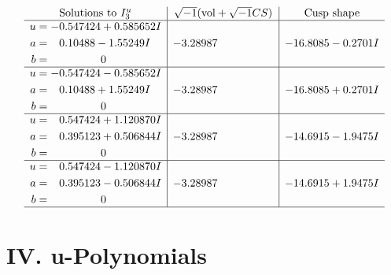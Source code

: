 \documentclass[1p]{elsarticle_modified}
\theoremstyle{definition}
\newcommand{\I}{\sqrt{-1}}
\begin{document}
$$\begin{array}{c|c|c}  
\text{Solutions to }I^u_{3}& \I (\text{vol} + \sqrt{-1}CS) & \text{Cusp shape}\\
 \hline 
\begin{aligned}
u &= -0.547424 + 0.585652 I \\
a &= \phantom{-}0.10488 - 1.55249 I \\
b &= \phantom{-0.000000 } 0\end{aligned}
 & -3.28987\phantom{ +0.000000I} & -16.8085 - 0.2701 I \\ \hline\begin{aligned}
u &= -0.547424 - 0.585652 I \\
a &= \phantom{-}0.10488 + 1.55249 I \\
b &= \phantom{-0.000000 } 0\end{aligned}
 & -3.28987\phantom{ +0.000000I} & -16.8085 + 0.2701 I \\ \hline\begin{aligned}
u &= \phantom{-}0.547424 + 1.120870 I \\
a &= \phantom{-}0.395123 + 0.506844 I \\
b &= \phantom{-0.000000 } 0\end{aligned}
 & -3.28987\phantom{ +0.000000I} & -14.6915 - 1.9475 I \\ \hline\begin{aligned}
u &= \phantom{-}0.547424 - 1.120870 I \\
a &= \phantom{-}0.395123 - 0.506844 I \\
b &= \phantom{-0.000000 } 0\end{aligned}
 & -3.28987\phantom{ +0.000000I} & -14.6915 + 1.9475 I\\
 \hline 
 \end{array}$$\newpage
\newpage\renewcommand{\arraystretch}{1}
\centering \section*{ IV. u-Polynomials}
\end{document}
